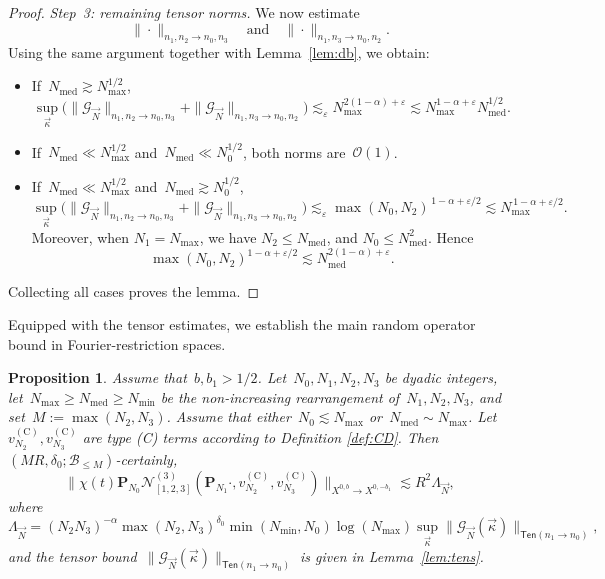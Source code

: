 \documentclass[11pt,reqno,english]{amsart}
\numberwithin{equation}{section}
\theoremstyle{plain}
\newtheorem{proposition}[theorem]{Proposition}
\theoremstyle{definition}
\theoremstyle{remark}
\renewcommand{\epsilon}{\varepsilon}
\begin{document}
\begin{proof}
		\emph{Step~3: remaining tensor norms.}
		We now estimate
		\[
		\|\cdot\|_{n_1,n_2\to n_0,n_3}
		\quad\text{and}\quad
		\|\cdot\|_{n_1,n_3\to n_0,n_2}.
		\]
		Using the same argument together with Lemma~\ref{lem:db}, we obtain:
		\begin{itemize}
			\item If~$N_{\mathrm{med}}\gtrsim N_{\max}^{1/2}$,
			\[
			\sup_{\vec\kappa}
			\big(
			\|\mathcal G_{\vec N}\|_{n_1,n_2\to n_0,n_3}
			+
			\|\mathcal G_{\vec N}\|_{n_1,n_3\to n_0,n_2}
			\big)
			\lesssim_{\varepsilon}
			N_{\max}^{2(1-\alpha)+\varepsilon}\lesssim N_{\max}^{1-\alpha+\epsilon}N_{\mathrm{med}}^{1/2}.
			\]
			\item If~$N_{\mathrm{med}} \ll N_{\max}^{1/2}$ and~$N_{\mathrm{med}}\ll N_0^{1/2}$, both norms are~$\mathcal O(1)$.
			\item If~$N_{\mathrm{med}}\ll N_{\max}^{1/2}$ and~$N_{\mathrm{med}}\gtrsim N_0^{1/2}$,
			\[
		\sup_{\vec\kappa}
			\big(
			\|\mathcal G_{\vec N}\|_{n_1,n_2\to n_0,n_3}
			+
			\|\mathcal G_{\vec N}\|_{n_1,n_3\to n_0,n_2}
			\big)
			\lesssim_{\varepsilon}
			\max(N_0,N_{2})^{\,1-\alpha+\varepsilon/2}
			\lesssim
			N_{\mathrm{max}}^{\,1-\alpha+\varepsilon/2}.
			\]
			Moreover, when $N_1=N_{\max}$, we have $N_2\leq N_{\mathrm{med}}$, and $N_0\leq N_{\mathrm{med}}^2$. Hence \[\max(N_0,N_2)^{1-\alpha+\varepsilon/2}\lesssim N_{\mathrm{med}}^{2(1-\alpha)+\epsilon}.
	      \]
		\end{itemize}
		
		Collecting all cases proves the lemma.
	\end{proof}
	



Equipped with the tensor estimates, we establish the main random operator bound in Fourier-restriction spaces.
	
	\begin{proposition}\label{prop:random-opdyadic}
	Assume that~$b,b_1>1/2$. Let~$N_0,N_1,N_2,N_3$ be dyadic integers, let~$N_{\mathrm{max}}\geq N_{\mathrm{med}}\geq N_{\mathrm{min}}$ be the non-increasing rearrangement of~$N_1,N_2,N_3$, and set~$M:=\max(N_2,N_3)$. Assume that either~$N_0\lesssim N_{\mathrm{max}}$ or~$N_{\mathrm{med}}\sim N_{\mathrm{max}}$. Let $v_{N_2}^{(\mathrm{C})},v_{N_3}^{(\mathrm{C})}$ are type (C) terms according to Definition \ref{def:CD}. Then $(MR,\delta_0;\mathcal{B}_{\leq M})$-certainly,
	\[
	\|\chi(t)\mathbf{P}_{N_0}\mathcal{N}_{[1,2,3]}^{(3)}(\mathbf{P}_{N_1}\cdot,v_{N_2}^{(\mathrm{C})},v_{N_3}^{\mathrm{(C)}}) \|_{X^{0,b}\to X^{0,-b_1}}\lesssim R^2\Lambda_{\vec{N}},
	\]
	where
	\[
	\Lambda_{\vec{N}}=(N_2N_3)^{-\alpha}\max(N_2,N_3)^{\delta_0}\min(N_{\mathrm{min}},N_0)\log(N_{\mathrm{max}})\sup_{\vec{\kappa}}\|\mathcal{G}_{\vec{N}}(\vec{\kappa})\|_{\mathsf{Ten}(n_{1}\to n_{0})},
	\]
	and the tensor bound~$\|\mathcal{G}_{\vec{N}}(\vec{\kappa})\|_{\mathsf{Ten}(n_{1}\to n_{0})}$ is given in Lemma~\ref{lem:tens}.
\end{proposition}
\end{document}
